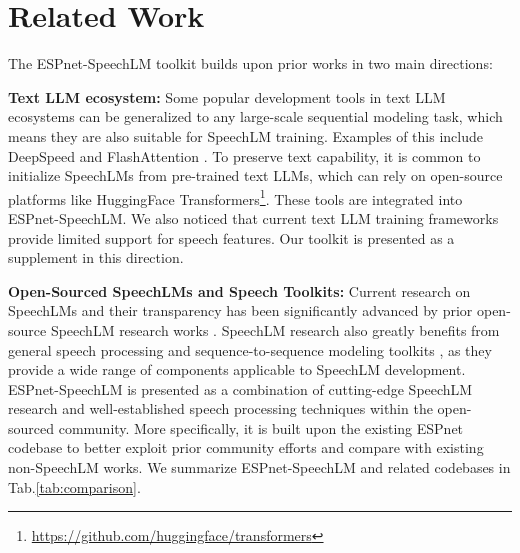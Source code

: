 \section{Related Work}
\label{related_work}
\vspace{-3pt}

The ESPnet-SpeechLM toolkit builds upon prior works in two main directions:

\noindent\textbf{Text LLM ecosystem:} 
Some popular development tools in text LLM ecosystems can be generalized to any large-scale sequential modeling task, which means they are also suitable for SpeechLM training. Examples of this include DeepSpeed \cite{deepspeed} and FlashAttention \cite{flashattention}.
To preserve text capability, it is common to initialize SpeechLMs from pre-trained text LLMs, which can rely on open-source platforms like HuggingFace Transformers\footnote{\url{https://github.com/huggingface/transformers}}. These tools are integrated into ESPnet-SpeechLM. 
We also noticed that current text LLM training frameworks \cite{megatron, llamafactory} provide limited support for speech features. Our toolkit is presented as a supplement in this direction.

\noindent\textbf{Open-Sourced SpeechLMs and Speech Toolkits:} Current research on SpeechLMs and their transparency has been significantly advanced by prior open-source SpeechLM research works \cite{glmvoice, mini_omni, moshi, uniaudio, voxtlm}.
SpeechLM research also greatly benefits from general speech processing and sequence-to-sequence modeling toolkits \cite{espnet, speechbrain, amphion, s3prl, nemo, fairseq}, as they provide a wide range of components applicable to SpeechLM development. 
ESPnet-SpeechLM is presented as a combination of cutting-edge SpeechLM research and well-established speech processing techniques within the open-sourced community. 
More specifically, it is built upon the existing ESPnet \cite{espnet} codebase to better exploit prior community efforts and compare with existing non-SpeechLM works.
We summarize ESPnet-SpeechLM and related codebases in Tab.\ref{tab:comparison}.



